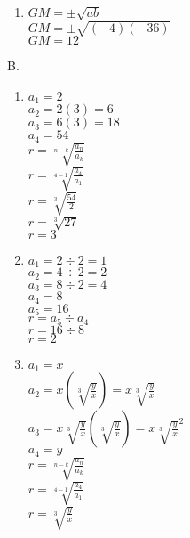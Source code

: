 \begin{multicols}{2}
\begin{enumerate}[label = \arabic*. ]
	\item %
$GM=\pm\sqrt{ab} $\\
$GM=\pm\sqrt{(-4)(-36)} $\\
$GM=12 $\\

\end{enumerate}

\vspce

B. %

\begin{enumerate}[label = \arabic*. ]
%

\item %
$a_1=2$\\
$a_2=2(3)=6$\\
$a_3=6(3)=18$\\
$a_4=54$\\

$r=\sqrt[n-k]{\displaystyle \frac{a_n}{a_k}} $\\
$r=\sqrt[4-1]{\displaystyle \frac{a_4}{a_1}} $\\
$r=\sqrt[3]{\displaystyle \frac{54}{2}} $\\
$r=\sqrt[3]{27} $\\
$r=3$

\item %
$a_1=2\div 2=1$\\
$a_2=4\div 2=2$\\
$a_3=8\div 2=4$\\
$a_4=8$\\
$a_5=16$\\
$r= a_5 \div a_4$\\
$r= 16 \div 8$\\
$r= 2$

\item %
$a_1=x$\\
$a_2=x\left(\sqrt[3]{\displaystyle \frac{y}{x}} \right) =x\sqrt[3]{\displaystyle \frac{y}{x}} $\\
$a_3=x\sqrt[3]{\displaystyle \frac{y}{x}}\left(\sqrt[3]{\displaystyle \frac{y}{x}} \right) =x\sqrt[3]{\displaystyle \frac{y}{x}}^2$\\
$a_4=y$\\

$r=\sqrt[n-k]{\displaystyle \frac{a_n}{a_k}} $\\
$r=\sqrt[4-1]{\displaystyle \frac{a_4}{a_1}} $\\
$r=\sqrt[3]{\displaystyle \frac{y}{x}} $\\


\end{enumerate}
\end{multicols}
